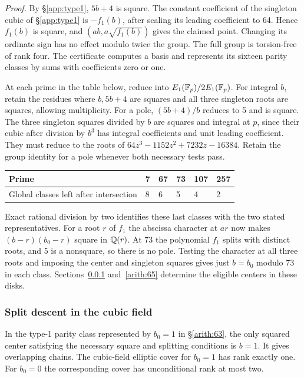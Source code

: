 \emph{Proof.} By \S\ref{app:type1}, \(5b+4\) is square. The constant coefficient of the
singleton cubic of \S\ref{app:type1} is \(-f_1(b)\), after scaling its leading
coefficient to 64. Hence \(f_1(b)\) is square, and
\((ab,a\sqrt{f_1(b)})\) gives the claimed point. Changing its ordinate
sign has no effect modulo twice the group. The full group is torsion-free
of rank four. The certificate computes a basis and represents its sixteen
parity classes by sums with coefficients zero or one.

At each prime in the table below, reduce into
\(E_1(\mathbb F_p)/2E_1(\mathbb F_p)\). For integral \(b\), retain the
residues where \(b,5b+4\) are squares and all three singleton roots
are squares, allowing multiplicity. For a pole, \((5b+4)/b\) reduces
to 5 and is square. The three singleton squares divided by \(b\) are
squares and integral at \(p\), since their cubic after division by
\(b^3\) has integral coefficients and unit leading coefficient. They
must reduce to the roots of \(64z^3-1152z^2+7232z-16384\). Retain the
group identity for a pole whenever both necessary tests pass.

{
\begin{longtable}[]{@{}llllll@{}}
\toprule\noalign{}
Prime & 7 & 67 & 73 & 107 & 257 \\
\midrule\noalign{}
\endhead
\bottomrule\noalign{}
\endlastfoot
Global classes left after intersection & 8 & 6 & 5 & 4 & 2 \\
\end{longtable}
}

Exact rational division by two identifies these last classes with the
two stated representatives. For a root \(r\) of \(f_1\) the abscissa character
at \(ar\) now makes \((b-r)(b_0-r)\) square in \(\mathbb Q(r)\).
At 73 the polynomial \(f_1\) splits with distinct roots, and 5 is a
nonsquare, so there is no pole. Testing the character at all three roots
and imposing the center and singleton squares gives just \(b=b_0\)
modulo 73 in each class. Sections~\ref{arith:64} and~\ref{arith:65} determine the eligible
centers in these disks.

\subsubsection{Split descent in the cubic field}\label{arith:64}

In the type-1 parity class represented by \(b_0=1\) in
\S\ref{arith:63}, the only squared center satisfying the necessary square
and splitting conditions is \(b=1\). It gives overlapping chains. The
cubic-field elliptic cover for \(b_0=1\) has rank exactly one. For
\(b_0=0\) the corresponding cover has unconditional rank at most two.

